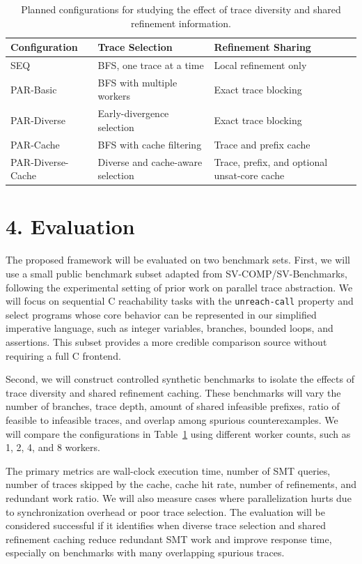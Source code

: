 \documentclass[11pt, a4paper]{article}
\begin{document}
\begin{table}[h]
\centering
\small
\begin{tabular}{|l|l|l|}
\hline
\textbf{Configuration} & \textbf{Trace Selection} & \textbf{Refinement Sharing} \\
\hline
SEQ & BFS, one trace at a time & Local refinement only \\
\hline
PAR-Basic & BFS with multiple workers & Exact trace blocking \\
\hline
PAR-Diverse & Early-divergence selection & Exact trace blocking \\
\hline
PAR-Cache & BFS with cache filtering & Trace and prefix cache \\
\hline
PAR-Diverse-Cache & Diverse and cache-aware selection & Trace, prefix, and optional unsat-core cache \\
\hline
\end{tabular}
\caption{Planned configurations for studying the effect of trace diversity and shared refinement information.}
\label{tab:configs}
\end{table}

\section*{4. Evaluation}
The proposed framework will be evaluated on two benchmark sets. First, we will use a small public benchmark subset adapted from SV-COMP/SV-Benchmarks, following the experimental setting of prior work on parallel trace abstraction. We will focus on sequential C reachability tasks with the \texttt{unreach-call} property and select programs whose core behavior can be represented in our simplified imperative language, such as integer variables, branches, bounded loops, and assertions. This subset provides a more credible comparison source without requiring a full C frontend.

Second, we will construct controlled synthetic benchmarks to isolate the effects of trace diversity and shared refinement caching. These benchmarks will vary the number of branches, trace depth, amount of shared infeasible prefixes, ratio of feasible to infeasible traces, and overlap among spurious counterexamples. We will compare the configurations in Table~\ref{tab:configs} using different worker counts, such as 1, 2, 4, and 8 workers.

The primary metrics are wall-clock execution time, number of SMT queries, number of traces skipped by the cache, cache hit rate, number of refinements, and redundant work ratio. We will also measure cases where parallelization hurts due to synchronization overhead or poor trace selection. The evaluation will be considered successful if it identifies when diverse trace selection and shared refinement caching reduce redundant SMT work and improve response time, especially on benchmarks with many overlapping spurious traces.
\end{document}
